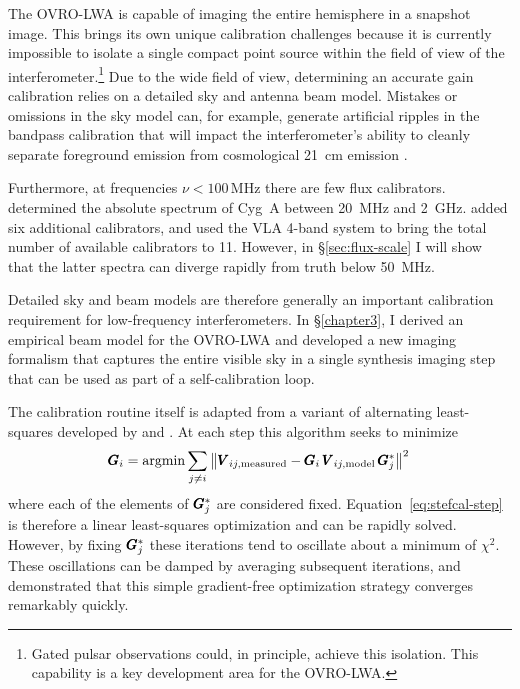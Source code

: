 \begin{bibunit}
The OVRO-LWA is capable of imaging the entire hemisphere in a snapshot image. This brings its own
unique calibration challenges because it is currently impossible to isolate a single compact point source
within the field of view of the interferometer.\footnote{
    Gated pulsar observations could, in principle, achieve this isolation. This capability is a key
    development area for the OVRO-LWA.
}
Due to the wide field of view, determining an accurate gain calibration relies on a detailed sky
and antenna beam model. Mistakes or omissions in the sky model can, for example, generate artificial
ripples in the bandpass calibration that will impact the interferometer's ability to cleanly
separate foreground emission from cosmological 21~cm emission \citep{2016MNRAS.461.3135B}.

Furthermore, at frequencies $\nu < 100\,\text{MHz}$ there are few flux calibrators.
\citet{1977A&A....61...99B} determined the absolute spectrum of Cyg~A between 20~MHz and 2~GHz.
\citet{2012MNRAS.423L..30S} added six additional calibrators, and \citet{2017ApJS..230....7P} used
the VLA 4-band system to bring the total number of available calibrators to 11. However, in
\S\ref{sec:flux-scale} I will show that the latter spectra can diverge rapidly from truth below
50~MHz.

Detailed sky and beam models are therefore generally an important calibration requirement for
low-frequency interferometers. In \S\ref{chapter3}, I derived an empirical beam model for the
OVRO-LWA and developed a new imaging formalism that captures the entire visible sky in a single
synthesis imaging step that can be used as part of a self-calibration loop.

The calibration routine itself is adapted from a variant of alternating least-squares developed by
\citet{2008ISTSP...2..707M} and \citet{2014A&A...571A..97S}. At each step this algorithm seeks to
minimize
\begin{equation}\label{eq:stefcal-step}
    \pmb G_i = \operatorname{argmin} \sum_{j \neq i}
        \left\|
            \pmb V_{ij, \text{measured}} - \pmb G_i \, \pmb V_{ij, \text{model}} \, \pmb G_j^*
        \right\|^2\,
\end{equation}
where each of the elements of $\pmb G_j^*$ are considered fixed. Equation~\ref{eq:stefcal-step} is
therefore a linear least-squares optimization and can be rapidly solved. However, by fixing $\pmb
G_j^*$ these iterations tend to oscillate about a minimum of $\chi^2$. These oscillations can be
damped by averaging subsequent iterations, and \citet{2014A&A...571A..97S} demonstrated that this
simple gradient-free optimization strategy converges remarkably quickly.


\end{bibunit}
